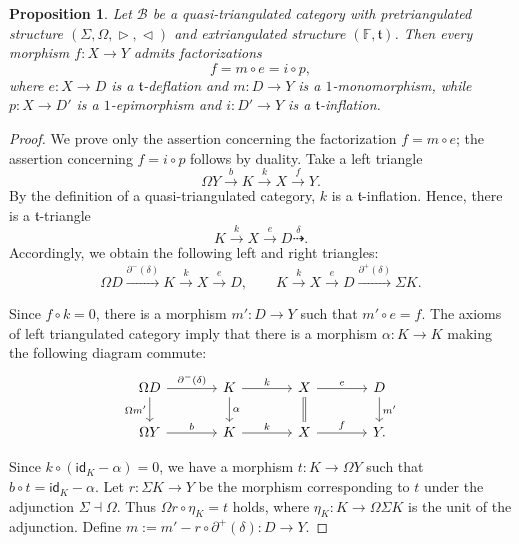 \documentclass[a4paper,reqno,10pt]{amsart}
\newtheorem{proposition}[proposition]{Proposition}
\theoremstyle{definition}
\theoremstyle{definition}
\theoremstyle{definition}
\theoremstyle{definition}
\theoremstyle{plain}
\newcommand{\id}{\mathsf{id}}
\newcommand{\ft}{\mathfrak{t}}
\newcommand{\BF}{\mathbb{F}}
\newcommand{\CB}{\mathcal{B}}
\begin{document}
\begin{proposition}
\label{prop:factorization_quasi_tr}
Let $\CB$ be a quasi-triangulated category with pretriangulated structure $(\Sigma,\Omega,\vartriangleright,\vartriangleleft)$ and extriangulated structure $(\BF,\ft)$. 
Then every morphism
$f\colon X\to Y$ admits factorizations
\[
f=m\circ e=i\circ p,
\]
where $e\colon X\to D$ is a $\ft$-deflation and
$m\colon D\to Y$ is a $1$-monomorphism, while
$p\colon X\to D'$ is a $1$-epimorphism and
$i\colon D'\to Y$ is a $\ft$-inflation.
\end{proposition}
\begin{proof}
We prove only the assertion concerning the factorization
$f=m\circ e$; the assertion concerning $f=i\circ p$ follows by
duality.
Take a left triangle
\[
\Omega Y\xrightarrow{b}K\xrightarrow{k}X\xrightarrow{f}Y.
\]
By the definition of a quasi-triangulated category, $k$ is a $\ft$-inflation. Hence, there is a $\ft$-triangle
\[
K\xrightarrow{k}X\xrightarrow{e}D\overset{\delta}{\dashrightarrow}.
\]
Accordingly, we obtain the following left and right triangles:
\[
\Omega D\xrightarrow{\partial^-(\delta)}K\xrightarrow{k}X\xrightarrow{e}D
, \qquad
K\xrightarrow{k}X\xrightarrow{e}D
\xrightarrow{\partial^+(\delta)}\Sigma K.
\]

Since $f\circ k=0$, there is a morphism $m'\colon D\to Y$ such that $m'\circ e=f$.
The axioms of left triangulated category imply that there is a morphism $\alpha\colon K\to K$ making the following diagram commute:
\[
\begin{tikzcd}[column sep=large]
\Omega D
  \arrow[r,"\partial^-(\delta)"]
  \arrow[d,"\Omega m'"']
&
K
  \arrow[r,"k"]
  \arrow[d,"\alpha"]
&
X
  \arrow[r,"e"]
  \arrow[d,equal]
&
D
  \arrow[d,"m'"]
\\
\Omega Y
  \arrow[r,"b"]
&
K
  \arrow[r,"k"]
&
X
  \arrow[r,"f"]
&
Y.
\end{tikzcd}
\]

Since $k\circ(\id_K-\alpha)=0$, we have a morphism $t\colon K\to\Omega Y$ such that $b\circ t=\id_K-\alpha$. 
Let $r\colon\Sigma K\to Y$ be the morphism corresponding to $t$ under the adjunction $\Sigma\dashv\Omega$. Thus $\Omega r\circ\eta_K=t$ holds,
where $\eta_K\colon K\to\Omega\Sigma K$ is the unit of the adjunction. 
Define $m:=m'-r\circ\partial^+(\delta)\colon D\to Y$.


\end{proof}
\end{document}
